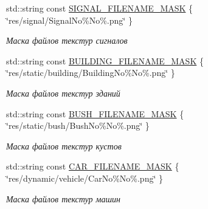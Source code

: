 \begin{Indent}
\begin{DoxyCompactItemize}
std\+::string const \hyperlink{namespacertm_aa9d61ca4243a3f2479f27c61535fcc9d}{S\+I\+G\+N\+A\+L\+\_\+\+F\+I\+L\+E\+N\+A\+M\+E\+\_\+\+M\+A\+SK} \{ \char`\"{}res/signal/Signal\+No\%No\%.png\char`\"{} \}
\begin{DoxyCompactList}\small\item\em Маска файлов текстур сигналов \end{DoxyCompactList}\item 
\mbox{\label{namespacertm_a7a49fe0b8d4f52458bfc22145e46faf5}} 
std\+::string const \hyperlink{namespacertm_a7a49fe0b8d4f52458bfc22145e46faf5}{B\+U\+I\+L\+D\+I\+N\+G\+\_\+\+F\+I\+L\+E\+N\+A\+M\+E\+\_\+\+M\+A\+SK} \{ \char`\"{}res/static/building/Building\+No\%No\%.png\char`\"{} \}
\begin{DoxyCompactList}\small\item\em Маска файлов текстур зданий \end{DoxyCompactList}\item 
\mbox{\label{namespacertm_a3739e886f219418af5924ad2e09d79dd}} 
std\+::string const \hyperlink{namespacertm_a3739e886f219418af5924ad2e09d79dd}{B\+U\+S\+H\+\_\+\+F\+I\+L\+E\+N\+A\+M\+E\+\_\+\+M\+A\+SK} \{ \char`\"{}res/static/bush/Bush\+No\%No\%.png\char`\"{} \}
\begin{DoxyCompactList}\small\item\em Маска файлов текстур кустов \end{DoxyCompactList}\item 
\mbox{\label{namespacertm_a72fea838addb841a6ea0173857a8eff1}} 
std\+::string const \hyperlink{namespacertm_a72fea838addb841a6ea0173857a8eff1}{C\+A\+R\+\_\+\+F\+I\+L\+E\+N\+A\+M\+E\+\_\+\+M\+A\+SK} \{ \char`\"{}res/dynamic/vehicle/Car\+No\%No\%.png\char`\"{} \}
\begin{DoxyCompactList}\small\item\em Маска файлов текстур машин \end{DoxyCompactList}\end{DoxyCompactItemize}
\end{Indent}
